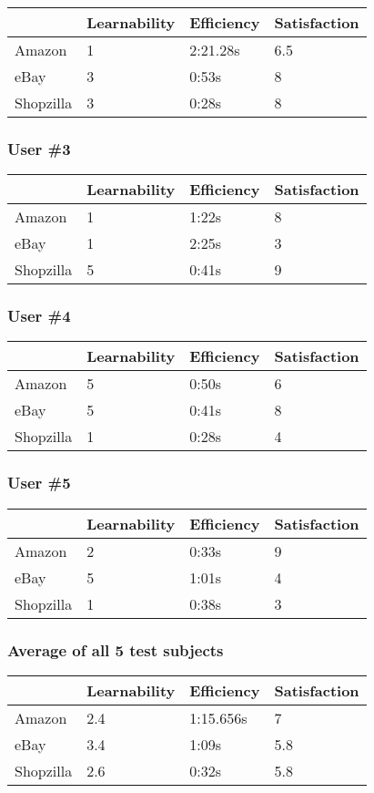 \documentclass[11pt, oneside]{article}   	%
\begin{document}
\begin{tabular}{| l | l | l | l |}
    \hline
     & Learnability & Efficiency & Satisfaction \\ \hline
    Amazon & 1 & 2:21.28s & 6.5 \\ \hline
    eBay & 3 & 0:53s & 8 \\ \hline
    Shopzilla & 3 & 0:28s & 8 \\\hline
\end{tabular}

\subsubsection{User \#3}

\begin{tabular}{| l | l | l | l |}
    \hline
     & Learnability & Efficiency & Satisfaction \\ \hline
    Amazon & 1 & 1:22s & 8 \\ \hline
    eBay & 1 & 2:25s & 3 \\ \hline
    Shopzilla & 5 & 0:41s & 9 \\\hline
\end{tabular}

\subsubsection{User \#4}

\begin{tabular}{| l | l | l | l |}
    \hline
     & Learnability & Efficiency & Satisfaction \\ \hline
    Amazon & 5 & 0:50s & 6 \\ \hline
    eBay & 5 & 0:41s & 8 \\ \hline
    Shopzilla & 1 & 0:28s & 4 \\\hline
\end{tabular}

\subsubsection{User \#5}

\begin{tabular}{| l | l | l | l |}
    \hline
     & Learnability & Efficiency & Satisfaction \\ \hline
    Amazon & 2 & 0:33s & 9 \\ \hline
    eBay & 5 & 1:01s & 4 \\ \hline
    Shopzilla & 1 & 0:38s & 3 \\\hline
\end{tabular}

\subsubsection{Average of all 5 test subjects}

\begin{tabular}{| l | l | l | l |}
    \hline
     & Learnability & Efficiency & Satisfaction \\ \hline
    Amazon & 2.4 & 1:15.656s & 7 \\ \hline
    eBay & 3.4 & 1:09s & 5.8 \\ \hline
    Shopzilla & 2.6 & 0:32s & 5.8 \\\hline
\end{tabular}
\end{document}
